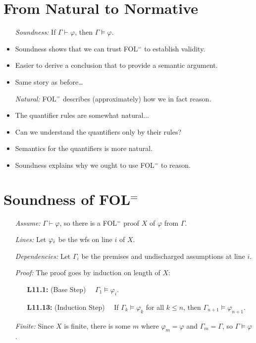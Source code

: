 \documentclass[a4paper, 11pt]{article} %
\begin{document}
\section*{From Natural to Normative}

\begin{itemize}
  \item[\it Soundness:] If $\Gamma \vdash \varphi$, then $\Gamma \vDash \varphi$.
  \item Soundness shows that we can trust FOL$^=$ to establish validity.
  \item Easier to derive a conclusion that to provide a semantic argument.
  \item Same story as before\ldots
  \item[\it Natural:] FOL$^=$ describes (approximately) how we in fact reason.
  \item The quantifier rules are somewhat natural...
  \item Can we understand the quantifiers only by their rules?
  \item Semantics for the quantifiers is more natural.
  \item Soundness explains why we ought to use FOL$^=$ to reason.
\end{itemize}




\section*{Soundness of FOL$^=$}

\begin{enumerate}
  \item[\it Assume:] $\Gamma \vdash \varphi$, so there is a FOL$^=$ proof $X$ of $\varphi$ from $\Gamma$. 
  \item[\it Lines:] Let $\varphi_i$ be the wfs on line $i$ of $X$.
  \item[\it Dependencies:] Let $\Gamma_i$ be the premises and undischarged assumptions at line $i$. 
  \item[\it Proof:] The proof goes by induction on length of $X$:
    \begin{itemize}
      \item[\bf L11.1:] (Base Step)~~ $\Gamma_1 \vDash \varphi_i$. 
      \item[\bf L11.13:] (Induction Step)~~ If $\Gamma_k \vDash \varphi_k$ for all $k\leq n$, then $\Gamma_{n+1} \vDash \varphi_{n+1}$. 
    \end{itemize}
  \item[\it Finite:] Since $X$ is finite, there is some $m$ where $\varphi_m=\varphi$ and $\Gamma_m=\Gamma$, so $\Gamma \vDash \varphi$.
\end{enumerate}
\end{document}
